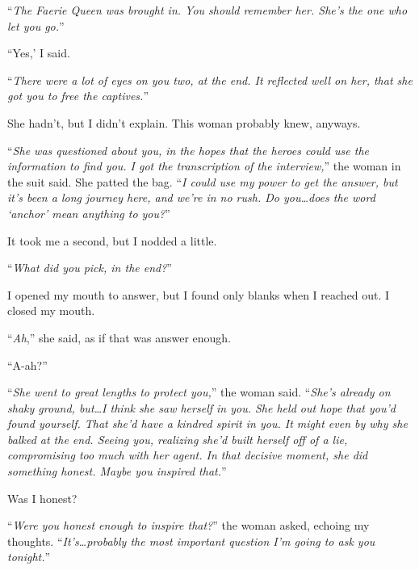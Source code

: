 ``\emph{The Faerie Queen was brought in.  You should remember her.  She's the one who let you go.}''



``Yes,' I said.



``\emph{There were a lot of eyes on you two, at the end.  It reflected well on her, that she got you to free the captives.}''



She hadn't, but I didn't explain.  This woman probably knew, anyways.



``\emph{She was questioned about you, in the hopes that the heroes could use the information to find you.  I got the transcription of the interview,}'' the woman in the suit said.  She patted the bag.  ``\emph{I could use my power to get the answer, but it's been a long journey here, and we're in no rush.  Do you\ldots does the word `anchor' mean anything to you?}''



It took me a second, but I nodded a little.



``\emph{What did you pick, in the end?}''



I opened my mouth to answer, but I found only blanks when I reached out.  I closed my mouth.



``\emph{Ah},'' she said, as if that was answer enough.



``A-ah?''



``\emph{She went to great lengths to protect you,}'' the woman said.  ``\emph{She's already on shaky ground, but\ldots I think she saw herself in you.  She held out hope that you'd found yourself.  That she'd have a kindred spirit in you.  It might even by why she balked at the end.  Seeing you, realizing she'd built herself off of a lie, compromising too much with her agent.  In that decisive moment, she did something honest.  Maybe you inspired that.}''



Was I honest?



``\emph{Were you honest enough to inspire that?}'' the woman asked, echoing my thoughts.  ``\emph{It's\ldots probably the most important question I'm going to ask you tonight.}''



